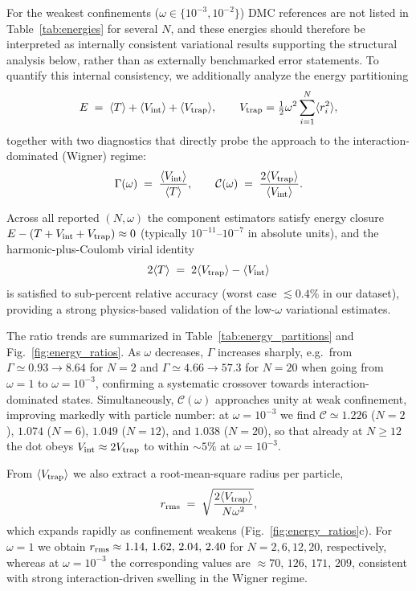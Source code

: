 \documentclass[superscriptaddress,unsortedaddress,amsmath,amssymb,aps]{revtex4-2}
\begin{document}
For the weakest confinements ($\omega\in\{10^{-3},10^{-2}\}$) DMC references are not listed in Table~\ref{tab:energies}
for several $N$, and these energies should therefore be interpreted as internally consistent variational results
supporting the structural analysis below, rather than as externally benchmarked error statements.
To quantify this internal consistency, we additionally analyze the energy partitioning
\begin{equation}
E \;=\; \langle T\rangle + \langle V_{\rm int}\rangle + \langle V_{\rm trap}\rangle,
\qquad
V_{\rm trap}=\tfrac12 \omega^2 \sum_{i=1}^N \langle r_i^2\rangle,
\end{equation}
together with two diagnostics that directly probe the approach to the interaction-dominated (Wigner) regime:
\begin{equation}
\Gamma(\omega) \;=\;\frac{\langle V_{\rm int}\rangle}{\langle T\rangle},
\qquad
\mathcal C(\omega)\;=\;\frac{2\langle V_{\rm trap}\rangle}{\langle V_{\rm int}\rangle}.
\label{eq:gamma-classical}
\end{equation}

Across all reported $(N,\omega)$ the component estimators satisfy energy closure
$E-(T+V_{\rm int}+V_{\rm trap})\approx 0$ (typically $10^{-11}$--$10^{-7}$ in absolute units), and the
harmonic-plus-Coulomb virial identity
\begin{equation}
2\langle T\rangle \;=\; 2\langle V_{\rm trap}\rangle - \langle V_{\rm int}\rangle
\end{equation}
is satisfied to sub-percent relative accuracy (worst case $\lesssim 0.4\%$ in our dataset), providing a strong
physics-based validation of the low-$\omega$ variational estimates.



The ratio trends are summarized in Table~\ref{tab:energy_partitions} and Fig.~\ref{fig:energy_ratios}.
As $\omega$ decreases, $\Gamma$ increases sharply, e.g.\ from
$\Gamma\simeq 0.93\to 8.64$ for $N=2$ and $\Gamma\simeq 4.66\to 57.3$ for $N=20$ when going from $\omega=1$ to $\omega=10^{-3}$,
confirming a systematic crossover towards interaction-dominated states.
Simultaneously, $\mathcal C(\omega)$ approaches unity at weak confinement, improving markedly with particle number:
at $\omega=10^{-3}$ we find $\mathcal C\simeq 1.226$ ($N=2$), $1.074$ ($N=6$), $1.049$ ($N=12$), and $1.038$ ($N=20$),
so that already at $N\ge 12$ the dot obeys $V_{\rm int}\approx 2V_{\rm trap}$ to within $\sim 5\%$ at $\omega=10^{-3}$.

From $\langle V_{\rm trap}\rangle$ we also extract a root-mean-square radius per particle,
\begin{equation}
r_{\rm rms} \;=\; \sqrt{\frac{2\langle V_{\rm trap}\rangle}{N\omega^2}},
\label{eq:rrms}
\end{equation}
which expands rapidly as confinement weakens (Fig.~\ref{fig:energy_ratios}c).
For $\omega=1$ we obtain $r_{\rm rms}\approx 1.14,\,1.62,\,2.04,\,2.40$ for $N=2,6,12,20$, respectively,
whereas at $\omega=10^{-3}$ the corresponding values are $\approx 70,\,126,\,171,\,209$,
consistent with strong interaction-driven swelling in the Wigner regime.
\end{document}
